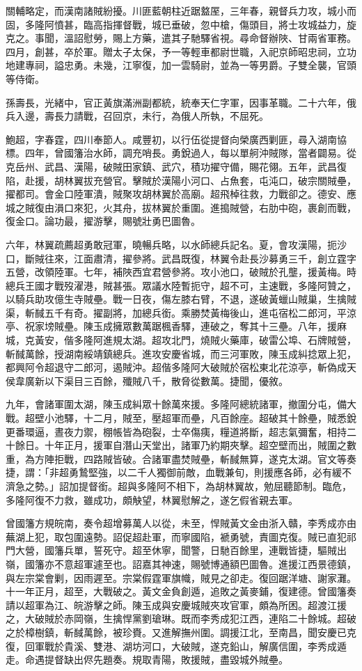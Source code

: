 \begin{pinyinscope}
關輔略定，而漢南諸賊紛擾。川匪藍朝柱近踞盩厔，三年春，親督兵力攻，城小而固，多隆阿憤甚，臨高指揮督戰，城已垂破，忽中槍，傷頭目，將士攻城益力，旋克之。事聞，溫詔慰勞，賜上方藥，遣其子馳驛省視。尋命督辦陜、甘兩省軍務。四月，創甚，卒於軍。贈太子太保，予一等輕車都尉世職，入祀京師昭忠祠，立功地建專祠，謚忠勇。未幾，江寧復，加一雲騎尉，並為一等男爵。子雙全襲，官頭等侍衛。

孫壽長，光緒中，官正黃旗滿洲副都統，統奉天仁字軍，因事革職。二十六年，俄兵入邊，壽長力請戰，召回京，未行，為俄人所執，不屈死。

鮑超，字春霆，四川奉節人。咸豐初，以行伍從提督向榮廣西剿匪，尋入湖南協標。四年，曾國籓治水師，調充哨長。勇銳過人，每以單舸沖賊隊，當者闢易。從克岳州、武昌、漢陽，破賊田家鎮、武穴，積功擢守備，賜花翎。五年，武昌復陷，赴援，胡林翼拔充營官。擊賊於漢陽小河口、占魚套，屯沌口，破宗關賊壘，擢都司。會金口陸軍潰，賊聚攻胡林翼於高廟。超飛棹往救，力戰卻之。德安、應城之賊復由溳口來犯，火其舟，拔林翼於重圍。進搗賊營，右肋中砲，裹創而戰，復金口。論功最，擢游擊，賜號壯勇巴圖魯。

六年，林翼疏薦超勇敢冠軍，曉暢兵略，以水師總兵記名。夏，會攻漢陽，扼沙口，斷賊往來，江面肅清，擢參將。武昌既復，林翼令赴長沙募勇三千，創立霆字五營，改領陸軍。七年，補陜西宜君營參將。攻小池口，破賊於孔壟，援黃梅。時總兵王國才戰歿濯港，賊甚張。眾議水陸暫扼守，超不可，主速戰，多隆阿贊之，以騎兵助攻億生寺賊壘。戰一日夜，傷左膝右臂，不退，遂破黃蠟山賊巢，生擒賊渠，斬馘五千有奇。擢副將，加總兵銜。乘勝焚黃梅後山，進屯宿松二郎河，平涼亭、祝家塝賊壘。陳玉成擁眾數萬踞楓香驛，連破之，奪其十三壘。八年，援麻城，克黃安，偕多隆阿進規太湖。超攻北門，燒賊火藥庫，破雷公埠、石牌賊營，斬馘萬餘，授湖南綏靖鎮總兵。進攻安慶省城，而三河軍敗，陳玉成糾捻眾上犯，都興阿令超退守二郎河，遏賊沖。超偕多隆阿大破賊於宿松東北花涼亭，斬偽成天侯韋廣新以下渠目三百餘，殲賊八千，散脅從數萬。捷聞，優敘。

九年，會諸軍圍太湖，陳玉成糾眾十餘萬來援。多隆阿總統諸軍，撤圍分屯，備大戰。超壁小池驛，十二月，賊至，壓超軍而壘，凡百餘座。超破其十餘壘，賊悉銳更番環逼，晝夜力禦，棚帳皆為砲裂，士卒傷痍，糧道將斷，超志氣彌奮，相持二十餘日。十年正月，援軍自潛山天堂出，諸軍乃約期夾擊。超空壁而出，賊圍之數重，為方陣拒戰，四路賊皆破。合諸軍盡焚賊壘，斬馘無算，遂克太湖。官文等奏捷，謂：「非超勇鷙堅強，以二千人獨御前敵，血戰兼旬，則援應各師，必有緩不濟急之勢。」詔加提督銜。超與多隆阿不相下，為胡林翼故，勉屈聽節制。臨危，多隆阿復不力救，雖成功，頗觖望，林翼慰解之，遂乞假省親去軍。

曾國籓方規皖南，奏令超增募萬人以從，未至，悍賊黃文金由浙入贛，李秀成亦由蕪湖上犯，取包圍遠勢。詔促超赴軍，而寧國陷，褫勇號，責圖克復。賊已直犯祁門大營，國籓兵單，誓死守。超至休寧，聞警，日馳百餘里，連戰皆捷，驅賊出嶺，國籓亦不意超軍遽至也。詔嘉其神速，賜號博通額巴圖魯。進援江西景德鎮，與左宗棠會剿，因雨遲至。宗棠假霆軍旗幟，賊見之卻走。復回踞洋塘、謝家灘。十一年正月，超至，大戰破之。黃文金負創遁，追敗之黃麥鋪，復建德。曾國籓奏請以超軍為江、皖游擊之師。陳玉成與安慶城賊夾攻官軍，頗為所困。超渡江援之，大破賊於赤岡嶺，生擒悍黨劉瑲琳。既而李秀成犯江西，連陷二十餘城。超破之於樟樹鎮，斬馘萬餘，被珍賚。又進解撫州圍。調援江北，至南昌，聞安慶已克復，回軍戰於貴溪、雙港、湖坊河口，大破賊，遂克鉛山，解廣信圍，李秀成遁走。命遇提督缺出侭先題奏。規取青陽，敗援賊，盡毀城外賊壘。


\end{pinyinscope}
